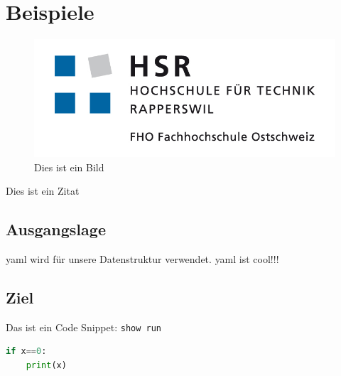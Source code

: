 \section*{Beispiele}

\begin{figure}[h]
	\includegraphics[width=0.7\linewidth]{images/hsrlogo.png}
	\caption{Dies ist ein Bild}
\end{figure}

Dies ist ein Zitat \cite{Matthews201111}

\subsection*{Ausgangslage}
\gls{yaml} wird für unsere Datenstruktur verwendet. \gls{yaml} ist cool!!! 

\subsection*{Ziel}
Das ist ein Code Snippet: \lstinline|show run|
\begin{lstlisting}[language=Python]
if x==0:
    print(x)
\end{lstlisting}

\newpage